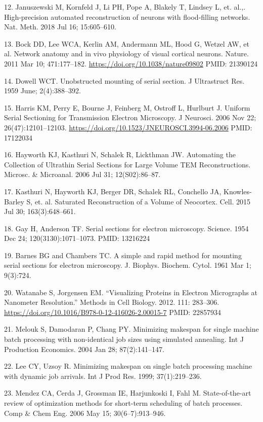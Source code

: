 \documentclass{article}
\begin{document}
\begin{hangpars}
12. Januszewski M, Kornfeld J, Li PH, Pope A, Blakely T, Lindsey L, et. al.,. High-precision automated reconstruction of neurons with flood-filling networks. Nat. Meth. 2018 Jul 16; 15:605–610.

13. Bock DD, Lee WCA, Kerlin AM, Andermann ML, Hood G, Wetzel AW, et al. Network anatomy and in vivo physiology of visual cortical neurons. Nature. 2011 Mar 10; 471:177–182. \url{https://doi.org/10.1038/nature09802} PMID: 21390124

14. Dowell WCT. Unobstructed mounting of serial section. J Ultrastruct Res. 1959 June; 2(4):388–392.

15. Harris KM, Perry E, Bourne J, Feinberg M, Ostroff L, Hurlburt J. Uniform Serial Sectioning for Transmission Electron Microscopy. J Neurosci. 2006 Nov 22; 26(47):12101–12103. \url{https://doi.org/10.1523/JNEUROSCI.3994-06.2006} PMID: 17122034

16. Hayworth KJ, Kasthuri N, Schalek R, Lickthman JW. Automating the Collection of Ultrathin Serial Sections for Large Volume TEM Reconstructions. Microsc. \& Microanal. 2006 Jul 31; 12(S02):86–87.

17. Kasthuri N, Hayworth KJ, Berger DR, Schalek RL, Conchello JA, Knowles-Barley S, et. al. Saturated Reconstruction of a Volume of Neocortex. Cell. 2015 Jul 30; 163(3):648–661.

18. Gay H, Anderson TF. Serial sections for electron microscopy. Science. 1954 Dec 24; 120(3130):1071–1073. PMID: 13216224

19. Barnes BG and Chambers TC. A simple and rapid method for mounting serial sections for electron microscopy. J. Biophys. Biochem. Cytol. 1961 Mar 1; 9(3):724.

20. Watanabe S, Jorgensen EM. “Visualizing Proteins in Electron Micrographs at Nanometer Resolution.” Methods in Cell Biology. 2012. 111: 283–306. \url{https://doi.org/10.1016/B978-0-12-416026-2.00015-7} PMID: 22857934

21. Melouk S, Damodaran P, Chang PY. Minimizing makespan for single machine batch processing with non-identical job sizes using simulated annealing. Int J Production Economics. 2004 Jan 28; 87(2):141–147.

22. Lee CY, Uzsoy R. Minimizing makespan on single batch processing machine with dynamic job arrivals. Int J Prod Res. 1999; 37(1):219–236.

23. Mendez CA, Cerda J, Grossman IE, Harjunkoski I, Fahl M. State-of-the-art review of optimization methods for short-term scheduling of batch processes. Comp \& Chem Eng. 2006 May 15; 30(6–7):913–946.


\end{hangpars}
\end{document}
